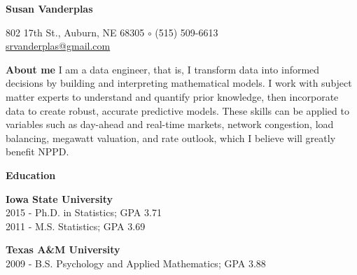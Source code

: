 \documentclass[letterpaper,12pt,final]{memoir}
\newcommand{\MedSep}{\vspace{1em}}
\newcommand{\SmallSep}{\vspace{0.5em}}
\newenvironment{AboutMe}
	{\ignorespaces\textbf{\color{RoyalBlue} About me}}
	{\MedSep\ignorespacesafterend}
\newcommand{\CVSection}[1]
	{\Large\textbf{#1}\par
	\SmallSep\normalsize\normalfont}
\newcommand{\CVItem}[1]
	{\textbf{\color{RoyalBlue} #1}}
\begin{document}



\begin{minipage}[t]{.5\linewidth}
\Huge\bfseries {\color{RoyalBlue} Susan Vanderplas} \\
\end{minipage}\hfill
\begin{minipage}[t]{.49\linewidth}
\begin{flushright}\small
\phantom{\Huge SVP}
802 17th St., Auburn, NE 68305 $\circ$ (515) 509-6613\\
\url{srvanderplas@gmail.com} 
\end{flushright}
\end{minipage}

\normalsize\normalfont
\SmallSep
\begin{AboutMe}
I am a data engineer, that is, I transform data into informed decisions by building and interpreting mathematical models. 
I work with subject matter experts to understand and quantify prior knowledge, then incorporate data to create robust, accurate predictive models. 
These skills can be applied to variables such as day-ahead and real-time markets, network congestion, load balancing, megawatt valuation, and rate outlook, which I believe will greatly benefit NPPD.\vspace{-6pt}
\end{AboutMe}

\CVSection{Education}
\begin{minipage}[t]{.45\linewidth}
\CVItem{Iowa State University}\\
2015 - Ph.D. in Statistics; GPA 3.71\\
2011 - M.S. Statistics; GPA 3.69
\end{minipage}
\begin{minipage}[t]{.55\linewidth}
\CVItem{Texas A\&M University}\\
2009 - B.S. Psychology and Applied Mathematics; GPA 3.88
\end{minipage}
\MedSep
\end{document}
